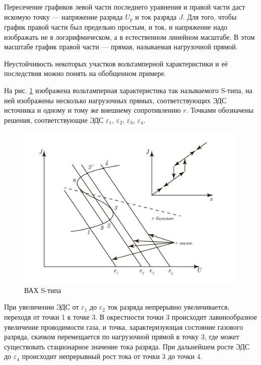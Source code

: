 \documentclass[a4paper, 12pt]{article}
\begin{document}
	\par
	Пересечение графиков  левой части последнего уравнения и правой части даст искомую точку — напряжение разряда $U_p$ и ток разряда $J$. Для того, чтобы график правой части был предельно простым, и ток, и напряжение надо изображать не в логарифмическом, а в естественном линейном масштабе. В этом масштабе график правой части — прямая, называемая нагрузочной прямой.\par
	Неустойчивость некоторых участков вольтамперной характеристики и её последствия можно понять на обобщенном примере.\par
	На рис. \ref{fig:Graph6} изображена вольтамперная характеристика так называемого S-типа, на ней изображены несколько нагрузочных прямых, соответствующих ЭДС источника и одному и тому же внешнему сопротивлению $r$. Точками обозначены решения, соответствующие ЭДС $\varepsilon_1$, $\varepsilon_2$, $\varepsilon_3$, $\varepsilon_4$.
	\begin{figure}[h]
		\centering
		\includegraphics[scale=0.4]{Graph6.pdf}
		\caption{ВАХ S-типа}
		\label{fig:Graph6}
	\end{figure}
	\par
	При увеличении ЭДС от $\varepsilon_1$ до $\varepsilon_2$ ток разряда непрерывно увеличивается, переходя от точки 1 к точке 3. В окрестности точки 3 происходит лавинообразное увеличение проводимости газа, и точка, характеризующая состояние газового разряда, скачком перемещается по нагрузочной прямой в точку 3, где может существовать стационарное значение тока разряда. При дальнейшем росте ЭДС до $\varepsilon_4$ происходит непрерывный рост тока от точки 3 до точки 4.\par
\end{document}
